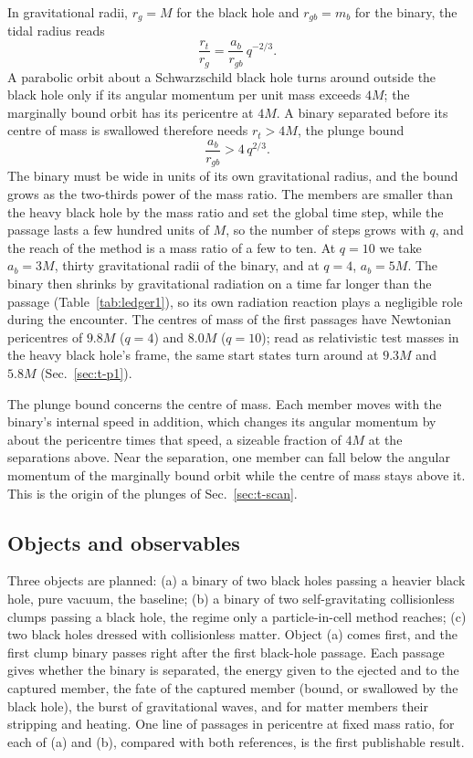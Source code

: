 \documentclass[aps,prd,twocolumn,10pt,superscriptaddress,nofootinbib,longbibliography,floatfix]{revtex4-2}
\newcommand{\rt}{r_t}
\newcommand{\mb}{m_b}
\begin{document}
In gravitational radii, $r_g=M$ for the black hole and $r_{gb}=\mb$ for the binary, the tidal radius reads
\begin{equation}\label{eq:rtrg}
\frac{\rt}{r_g}=\frac{a_b}{r_{gb}}\,q^{-2/3}.
\end{equation}
A parabolic orbit about a Schwarzschild black hole turns around outside the black hole only if its angular momentum per unit mass exceeds $4M$; the marginally bound orbit has its pericentre at $4M$. A binary separated before its centre of mass is swallowed therefore needs $\rt>4M$, the plunge bound
\begin{equation}\label{eq:plunge}
\frac{a_b}{r_{gb}}>4\,q^{2/3}.
\end{equation}
The binary must be wide in units of its own gravitational radius, and the bound grows as the two-thirds power of the mass ratio. The members are smaller than the heavy black hole by the mass ratio and set the global time step, while the passage lasts a few hundred units of $M$, so the number of steps grows with $q$, and the reach of the method is a mass ratio of a few to ten. At $q=10$ we take $a_b=3M$, thirty gravitational radii of the binary, and at $q=4$, $a_b=5M$. The binary then shrinks by gravitational radiation on a time far longer than the passage (Table~\ref{tab:ledger1}), so its own radiation reaction plays a negligible role during the encounter. The centres of mass of the first passages have Newtonian pericentres of $9.8M$ ($q=4$) and $8.0M$ ($q=10$); read as relativistic test masses in the heavy black hole's frame, the same start states turn around at $9.3M$ and $5.8M$ (Sec.~\ref{sec:t-p1}).

The plunge bound concerns the centre of mass. Each member moves with the binary's internal speed in addition, which changes its angular momentum by about the pericentre times that speed, a sizeable fraction of $4M$ at the separations above. Near the separation, one member can fall below the angular momentum of the marginally bound orbit while the centre of mass stays above it. This is the origin of the plunges of Sec.~\ref{sec:t-scan}.

\subsection{Objects and observables}\label{sec:objects}

Three objects are planned: (a) a binary of two black holes passing a heavier black hole, pure vacuum, the baseline; (b) a binary of two self-gravitating collisionless clumps passing a black hole, the regime only a particle-in-cell method reaches; (c) two black holes dressed with collisionless matter. Object (a) comes first, and the first clump binary passes right after the first black-hole passage. Each passage gives whether the binary is separated, the energy given to the ejected and to the captured member, the fate of the captured member (bound, or swallowed by the black hole), the burst of gravitational waves, and for matter members their stripping and heating. One line of passages in pericentre at fixed mass ratio, for each of (a) and (b), compared with both references, is the first publishable result.
\end{document}
